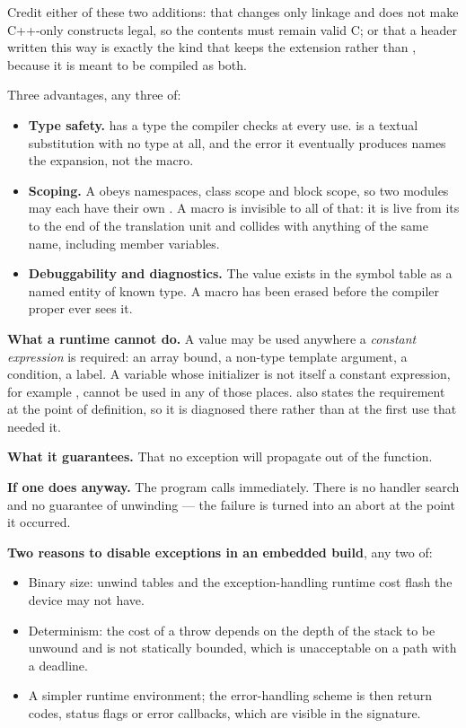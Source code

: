 Credit either of these two additions: that  changes only linkage and does not make
C++-only constructs legal, so the contents must remain valid C; or that a header written this way
is exactly the kind that keeps the  extension rather than , because it is meant
to be compiled as both.

Three advantages, any three of:
\begin{itemize}
  \item \textbf{Type safety.}  has a type the
    compiler checks at every use.  is a textual substitution
    with no type at all, and the error it eventually produces names the expansion, not the macro.
  \item \textbf{Scoping.} A  obeys namespaces, class scope and block scope, so two
    modules may each have their own . A macro is invisible to all of that: it is live
    from its  to the end of the translation unit and collides with anything of the
    same name, including member variables.
  \item \textbf{Debuggability and diagnostics.} The value exists in the symbol table as a named
    entity of known type. A macro has been erased before the compiler proper ever sees it.
\end{itemize}

\textbf{What a runtime  cannot do.} A  value may be used anywhere a
\emph{constant expression} is required: an array bound, a non-type template argument, a
 condition, a  label. A  variable whose initializer is
not itself a constant expression, for example ,
cannot be used in any of those places.  also states the requirement at the point of
definition, so it is diagnosed there rather than at the first use that needed it. 

\textbf{What it guarantees.} That no exception will propagate out of the function. 

\textbf{If one does anyway.} The program calls  immediately. There is no
handler search and no guarantee of unwinding --- the failure is turned into an abort at the point
it occurred. 

\textbf{Two reasons to disable exceptions in an embedded build}, any two of:
\begin{itemize}
  \item Binary size: unwind tables and the exception-handling runtime cost flash the device may not
    have.
  \item Determinism: the cost of a throw depends on the depth of the stack to be unwound and is not
    statically bounded, which is unacceptable on a path with a deadline.
  \item A simpler runtime environment; the error-handling scheme is then return codes, status flags
    or error callbacks, which are visible in the signature.
\end{itemize}

